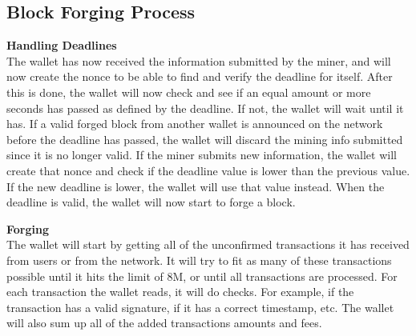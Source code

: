 \subsection{Block Forging Process}
\begin{flushleft}
    \textbf{Handling Deadlines}\\
The wallet has now received the information submitted by the miner, and will now create the nonce to be able to find and verify the deadline for itself. After this is done, the wallet will now check and see if an equal amount or more seconds has passed as defined by the deadline. If not, the wallet will wait until it has. If a valid forged block from another wallet is announced on the network before the deadline has passed, the wallet will discard the mining info submitted since it is no longer valid. If the miner submits new information, the wallet will create that nonce and check if the deadline value is lower than the previous value. If the new deadline is lower, the wallet will use that value instead. When the deadline is valid, the wallet will now start to forge a block.
\end{flushleft}
\begin{flushleft}
    \textbf{Forging}\\
    The wallet will start by getting all of the unconfirmed transactions it has received from users or from the network. It will try to fit as many of these transactions possible until it hits the limit of 8M, or until all transactions are processed. For each transaction the wallet reads, it will do checks. For example, if the transaction has a valid signature, if it has a correct timestamp, etc. The wallet will also sum up all of the added transactions amounts and fees.
\end{flushleft}
